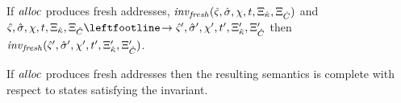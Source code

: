 \begin{lemma}
  If $\mathit{alloc}$ produces fresh addresses, $\mathit{inv}_{\mathit{fresh}}(\hat\varsigma,{\hat\sigma},\chi,t,\Xi_{\hat{\kappa}},\Xi_{\hat{C}})$ and
$\mastate,\mastore,\mmktab,\mtime,\mktab_{\makont},\mktab_{\mamkont} \stepto
\mastate',\mastore',\mmktab',\mtime',\mktab'_{\makont},\mktab'_{\mamkont}$ then
$\mathit{inv}_{\mathit{fresh}}(\hat\varsigma',{\hat\sigma}',\chi',t',\Xi'_{{\hat{\kappa}}},\Xi'_{{\hat{C}}})$.
\end{lemma}
\begin{theorem}
  If $\mathit{alloc}$ produces fresh addresses then the resulting semantics is complete with respect to states satisfying the invariant.
\end{theorem}
